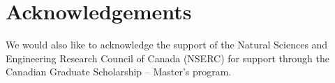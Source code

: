 \documentclass{amsart}
\def\AC{\color{blue}}
\theoremstyle{definition}
\begin{document}
\vspace{0.5cm}
\section*{Acknowledgements}
We would also like to acknowledge the support of the Natural Sciences and Engineering Research Council of Canada (NSERC) for support through the Canadian Graduate Scholarship -- Master's program.





\end{document}
